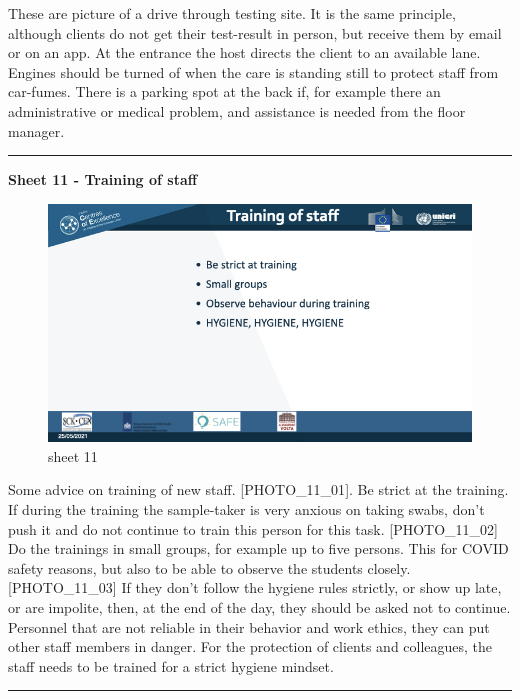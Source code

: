 \documentclass[
]{book}
\begin{document}
These are picture of a drive through testing site. It is the same
principle, although clients do not get their test-result in person, but
receive them by email or on an app. At the entrance the host directs the
client to an available lane. Engines should be turned of when the care
is standing still to protect staff from car-fumes. There is a parking
spot at the back if, for example there an administrative or medical
problem, and assistance is needed from the floor manager.

\begin{center}\rule{0.5\linewidth}{0.5pt}\end{center}

\textbf{Sheet 11 - Training of staff}

\begin{figure}
\centering
\includegraphics{images/m05/m05_Workflow_final.011.jpeg}
\caption{sheet 11}
\end{figure}

Some advice on training of new staff. {[}PHOTO\_11\_01{]}. Be strict at the
training. If during the training the sample-taker is very anxious on
taking swabs, don't push it and do not continue to train this person
for this task. {[}PHOTO\_11\_02{]} Do the trainings in small groups, for
example up to five persons. This for COVID safety reasons, but also to
be able to observe the students closely. {[}PHOTO\_11\_03{]} If they don't
follow the hygiene rules strictly, or show up late, or are impolite,
then, at the end of the day, they should be asked not to continue.
Personnel that are not reliable in their behavior and work ethics, they
can put other staff members in danger. For the protection of clients and
colleagues, the staff needs to be trained for a strict hygiene mindset.

\begin{center}\rule{0.5\linewidth}{0.5pt}\end{center}
\end{document}
